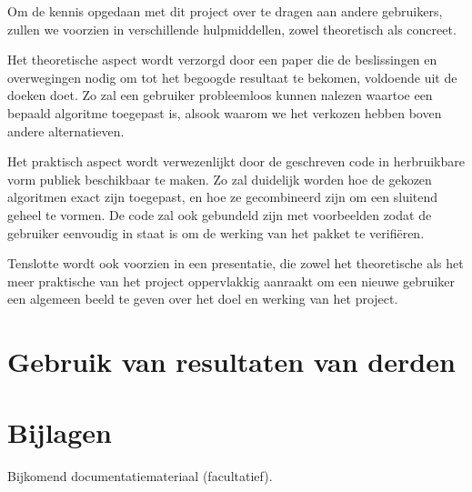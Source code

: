 \documentclass[]{book}
\begin{document}
Om de kennis opgedaan met dit project over te dragen aan andere gebruikers, zullen we voorzien in verschillende hulpmiddellen, zowel theoretisch als concreet.

Het theoretische aspect wordt verzorgd door een paper die de beslissingen en overwegingen nodig om tot het begoogde resultaat te bekomen, voldoende uit de doeken doet. Zo zal een gebruiker probleemloos kunnen nalezen waartoe een bepaald algoritme toegepast is, alsook waarom we het verkozen hebben boven andere alternatieven.

Het praktisch aspect wordt verwezenlijkt door de geschreven code in herbruikbare vorm publiek beschikbaar te maken. Zo zal duidelijk worden hoe de gekozen algoritmen exact zijn toegepast, en hoe ze gecombineerd zijn om een sluitend geheel te vormen. De code zal ook gebundeld zijn met voorbeelden zodat de gebruiker eenvoudig in staat is om de werking van het pakket te verifiëren.

Tenslotte wordt ook voorzien in een presentatie, die zowel het theoretische als het meer praktische van het project oppervlakkig aanraakt om een nieuwe gebruiker een algemeen beeld te geven over het doel en werking van het project.

\section{Gebruik van resultaten van derden}\label{sec:Gebruik}


\section{Bijlagen} \label{sec:Bijlagen}
Bijkomend documentatiemateriaal (facultatief). 
\end{document}
